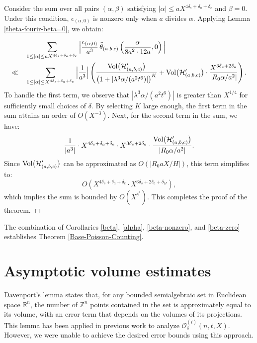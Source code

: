 \documentclass{article}
\def\Vol{{\rm Vol}}
\def\H{{\mathcal H}}
\def\H{{\mathcal H}}
\newenvironment{proof}{\noindent {\bf Proof:}}{$\Box$ \vspace{2 ex}}
\def \Bod{{\mathcal{O}^{(i)}_{\delta}(n,t,X)}}
\begin{document}
\begin{proof}
Consider the sum over all pairs $(\alpha, \beta)$ satisfying $|\alpha| \leq a X^{4\delta_s + \delta_a + \delta_e}$ and $\beta = 0$. Under this condition, $\epsilon_{(\alpha, 0)}$ is nonzero only when $a$ divides $\alpha$. Applying Lemma \ref{theta-fourir-beta=0}, we obtain:

\begin{align*}
    &\sum_{ 1 \leq |\alpha| \leq aX^{4\delta_s + \delta_a + \delta_e}} 
    \Big| \frac{\epsilon_{(\alpha, 0)}}{a^3} \, \widehat{\theta}_{(a, b, c)}\left(\frac{\alpha}{8a^2 \cdot 12a}, 0\right) \Big| \\ \ll
   \quad & \sum_{ 1 \leq |\alpha| \leq X^{4\delta_s + \delta_a + \delta_e}} 
    \Big| \frac{1}{a^3} \Big| \left( \frac{\Vol\big(\H'_{(a,b,c)}\big)}{\big(1 + | \lambda^3\alpha/(a^2t^6)|\big)^K} + \Vol\big(\H'_{(a,b,c)}\big) \cdot \frac{X^{3 \delta_s + 2 \delta_a}}{|R_0 \alpha/a^2|} \right).
\end{align*}
To handle the first term, we observe that $|\lambda^3\alpha/(a^2t^6)|$ is greater than $X^{1/4}$ for sufficiently small choices of $\delta$. By selecting $K$ large enough, the first term in the sum attains an order of $O(X^{-3})$.  Next, for the second term in the sum, we have:
\begin{equation*}
    \frac{1}{|a^3|}\cdot X^{4\delta_s + \delta_a + \delta_e} \cdot X^{3\delta_s+2\delta_a} \cdot \frac{\Vol\big(\H'_{(a,b,c)}\big)}{|R_0 \alpha /a^2|}.
\end{equation*}
Since $\Vol\big(\H'_{(a,b,c)}\big)$ can be approximated as $O(|R_0 aX/H|)$, this term simplifies to:
\begin{equation*}
   O( X^{4\delta_s + \delta_a + \delta_e} \cdot X^{3\delta_s+2\delta_a+\delta_H}),
\end{equation*}
which implies the sum is bounded by $O(X^{\delta^*})$. This completes the proof of the theorem.
\end{proof}

The combination of Corollaries \ref{beta}, \ref{alpha}, \ref{beta-nonzero}, and \ref{beta-zero} establishes Theorem \ref{Base-Poisson-Counting}.

\section{Asymptotic volume estimates }\label{sec4}
Davenport's lemma states that, for any bounded semialgebraic set in Euclidean space $\mathbb{R}^n$, the number of $\mathbb{Z}^n$ points contained in the set is approximately equal to its volume, with an error term that depends on the volumes of its projections. This lemma has been applied in previous work to analyze $\Bod$. However, we were unable to achieve the desired error bounds using this approach.  
\end{document}
